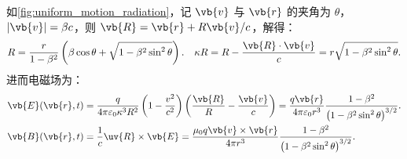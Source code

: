 如\cref{fig:uniform_motion_radiation}，记 \(\vb{v}\) 与 \(\vb{r}\) 的夹角为 \(\theta\)，\(|\vb{v}| = \beta c\)，则 \(\vb{R} = \vb{r} + R \vb{v}/c\)，解得：
\begin{align*}
	R = \dfrac{r}{1 - \beta^2} \left( \beta \cos\theta + \sqrt{1 - \beta^2 \sin^2\theta} \right). \quad \kappa R = R - \dfrac{\vb{R} \cdot \vb{v}}{c} = r \sqrt{1 - \beta^2 \sin^2\theta}.
\end{align*}
进而电磁场为：
\begin{align*}
	\vb{E}(\vb{r}, t) &= \dfrac{q}{4\pi \varepsilon_0 \kappa^3 R^2} \left(1 - \dfrac{v^2}{c^2}\right) \left( \dfrac{\vb{R}}{R} - \dfrac{\vb{v}}{c} \right) = \dfrac{q \vb{r}}{4\pi \varepsilon_0 r^3} \dfrac{1 - \beta^2}{\left(1 - \beta^2 \sin^2\theta\right)^{3/2}}.\\
	\vb{B}(\vb{r}, t) &= \dfrac{1}{c} \uv{R} \times \vb{E} = \dfrac{\mu_0 q \vb{v} \times \vb{r}}{4\pi r^3} \dfrac{1 - \beta^2}{\left(1 - \beta^2 \sin^2\theta\right)^{3/2}}.
\end{align*}

